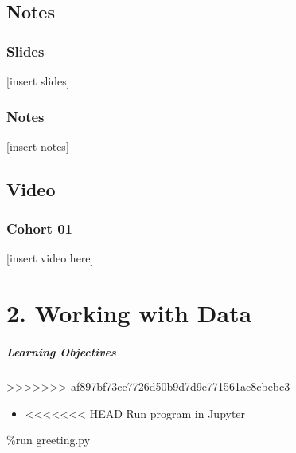 \documentclass[
  letterpaper,
  DIV=11,
  numbers=noendperiod]{scrreprt}
\newenvironment{Shaded}{\begin{snugshade}}{\end{snugshade}}
\newcommand{\NormalTok}[1]{\textcolor[rgb]{0.00,0.46,0.62}{#1}}
\newcommand{\OperatorTok}[1]{\textcolor[rgb]{0.37,0.37,0.37}{#1}}
\newcommand{\NormalTok}[1]{\textcolor[rgb]{0.00,0.48,0.65}{#1}}
\newcommand{\OperatorTok}[1]{\textcolor[rgb]{0.37,0.37,0.37}{#1}}
\providecommand{\tightlist}{%
  \setlength{\itemsep}{0pt}\setlength{\parskip}{0pt}}
\begin{document}
\hypertarget{notes}{%
\chapter*{Notes}\label{notes}}

\hypertarget{slides}{%
\section*{Slides}\label{slides}}

{[}insert slides{]}

\hypertarget{notes-1}{%
\section*{Notes}\label{notes-1}}

{[}insert notes{]}

\hypertarget{video}{%
\chapter*{Video}\label{video}}

\hypertarget{cohort-01}{%
\section*{Cohort 01}\label{cohort-01}}

{[}insert video here{]}

\part{2. Working with Data}

\hypertarget{learning-objectives-1}{%
\subsubsection*{Learning Objectives}\label{learning-objectives-1}}
>>>>>>> af897bf73ce7726d50b9d7d9e771561ac8cbebc3

\begin{itemize}
\tightlist
\item
<<<<<<< HEAD
  Run program in Jupyter
\end{itemize}

\begin{Shaded}
\begin{Highlighting}[]
\OperatorTok{\%}\NormalTok{run greeting.py}
\end{Highlighting}
\end{Shaded}
\end{document}
